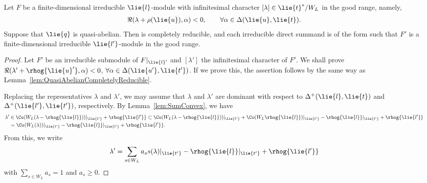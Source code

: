 \begin{Theorem}\label{thm:QuasiAbelianGoodRange}
	Let $F$ be a finite-dimensional irreducible $\lie{l}$-module with infinitesimal character $[\lambda] \in \lie{t}^*/W_L$
	in the good range, namely,
	\begin{align*}
		\Re(\lambda+\rho(\lie{u}), \alpha) < 0, \qquad \forall \alpha \in \Delta(\lie{u}, \lie{t}).
	\end{align*}
	Suppose that $\lie{q}$ is quasi-abelian.
	Then  is completely reducible,
	and each irreducible direct summand is of the form  such that $F'$ is a finite-dimensional irreducible $\lie{l'}$-module in the good range.
\end{Theorem}

\begin{proof}
	Let $F'$ be an irreducible submodule of $F|_{\lie{l}'}$ and $[\lambda']$ the infinitesimal character of $F'$.
	We shall prove
	$\Re(\lambda'+\rhog{\lie{u}'}, \alpha) < 0$, $\forall \alpha \in \Delta(\lie{u'}, \lie{t'})$.
	If we prove this, the assertion follows by the same way as Lemma~\ref{lem:QuasiAbelianCompletelyReducible}.

	Replacing the representatives $\lambda$ and $\lambda'$, we may assume that $\lambda$ and $\lambda'$ are dominant with respect to $\Delta^+(\lie{l}, \lie{t})$ and $\Delta^+(\lie{l'}, \lie{t'})$, respectively.
	By Lemma~\ref{lem:SumConvex}, we have
	\begin{align*}
		\lambda' &\in \Co(W_L(\lambda - \rhog{\lie{l}}))|_{\lie{t'}} + \rhog{\lie{l'}}
		 \subset \Co(W_{L}(\lambda-\rhog{\lie{l}}))|_{\lie{t'}}+\Co(W_{L}\rhog{\lie{l}})|_{\lie{t'}} - \rhog{\lie{l}}|_{\lie{t'}} + \rhog{\lie{l'}} \\
		&= \Co(W_{L}(\lambda))|_{\lie{t'}} - \rhog{\lie{l}}|_{\lie{t'}} + \rhog{\lie{l'}}.
	\end{align*}
	From this, we write
	\begin{align*}
		\lambda' = \sum_{s \in W_L} a_s s(\lambda)|_{\lie{t'}} - \rhog{\lie{l}}|_{\lie{t'}} + \rhog{\lie{l'}}
	\end{align*}
	with $\sum_{s\in W_L}a_s = 1$ and $a_s \geq 0$.


\end{proof}
